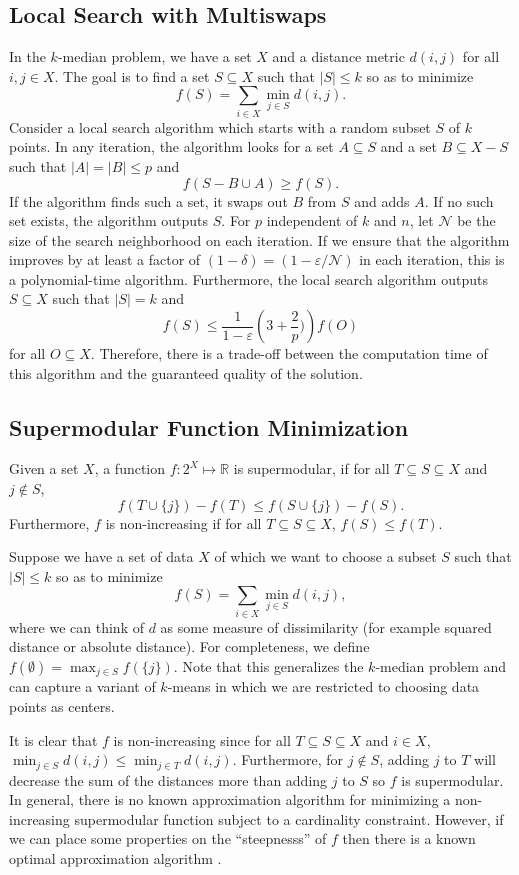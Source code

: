 \documentclass{article}
\begin{document}
\subsection{Local Search with Multiswaps}
In the $k$-median problem, we have a set $X$ and a distance metric $d(i,j)$ for all $i,j \in X$. The goal is to find a set $S \subseteq X$ such that $|S| \leq k$ so as to minimize 
\[ f(S) = \sum_{ i\in X} \min_{j \in S} d(i,j). \]
Consider a local search algorithm which starts with a random subset $S$ of $k$ points. In any iteration, the algorithm looks for a set $A \subseteq S$ and a set $B \subseteq X -S$ such that $|A| = |B| \leq p$ and
\[ f(S- B \cup A) \geq f(S). \]
If the algorithm finds such a set, it swaps out $B$ from $S$ and adds $A$. If no such set exists, the algorithm outputs $S$. For $p$ independent of $k$ and $n$, let $\mathcal{N}$ be the size of the search neighborhood on each iteration. If we ensure that the algorithm improves by at least a factor of $(1- \delta) = (1- \varepsilon/\mathcal{N})$ in each iteration, this is a polynomial-time algorithm. Furthermore, the local search algorithm outputs $S \subseteq X$ such that $|S| = k$ and
\[ f(S) \leq \frac{1}{1-\varepsilon} \left (3 + \frac{2}{p}) \right ) f(O) \]
for all $O \subseteq X$. Therefore, there is a trade-off between the computation time of this algorithm and the guaranteed quality of the solution. 

\subsection{Supermodular Function Minimization}
Given a set $X$, a function $f:2^{X} \mapsto \mathbb{R}$ is supermodular, if for all $T \subseteq S \subseteq X$ and $j \notin S$, 
\[ f(T \cup \{j\}) - f(T) \leq f(S \cup \{j\}) - f(S). \]
Furthermore, $f$ is non-increasing if for all $T \subseteq S \subseteq X$, $f(S) \leq f(T)$. 

Suppose we have a set of data $X$ of which we want to choose a subset $S$ such that $|S| \leq k$ so as to minimize 
\[ f(S) = \sum_{i \in X} \min_{j \in S} d(i,j) ,\]
where we can think of $d$ as some measure of dissimilarity (for example squared distance or absolute distance). For completeness, we define $f(\emptyset) = \max_{j \in S} f(\{j\})$. 
Note that this generalizes the $k$-median problem and can capture a variant of $k$-means in which we are restricted to choosing data points as centers.

It is clear that $f$ is non-increasing since for all $T \subseteq S \subseteq X$ and $i \in X$, $\min_{j \in S} d(i,j) \leq \min_{j \in T} d(i,j)$. Furthermore, for $j \notin S$, adding $j$ to $T$ will decrease the sum of the distances more than adding $j$ to $S$ so $f$ is supermodular. In general, there is no known approximation algorithm for minimizing a non-increasing supermodular function subject to a cardinality constraint. However, if we can place some properties on the ``steepnesss'' of $f$ then there is a known optimal approximation algorithm \cite{Sviridenko}.
\end{document}
